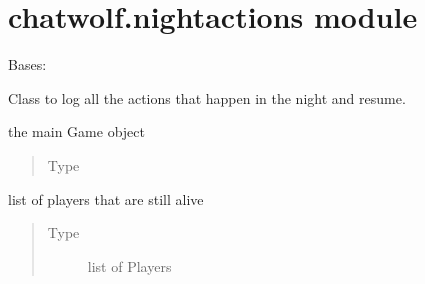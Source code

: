 \documentclass[letterpaper,10pt,english]{sphinxmanual}
\begin{document}
\section{chatwolf.nightactions module}
\label{\detokenize{chatwolf:module-chatwolf.nightactions}}\label{\detokenize{chatwolf:chatwolf-nightactions-module}}

\begin{fulllineitems}
\label{\detokenize{chatwolf:chatwolf.nightactions.Nightactions}}
Bases: 

Class to log all the actions that happen in the night and resume.

\begin{fulllineitems}
\label{\detokenize{chatwolf:chatwolf.nightactions.Nightactions.game}}
the main Game object
\begin{quote}\begin{description}
\item[{Type}] \leavevmode
{\hyperref[\detokenize{chatwolf:chatwolf.game.Game}]{}}

\end{description}\end{quote}

\end{fulllineitems}


\begin{fulllineitems}
\label{\detokenize{chatwolf:chatwolf.nightactions.Nightactions.alive}}
list of players that are still alive
\begin{quote}\begin{description}
\item[{Type}] \leavevmode
list of Players


\end{description}
\end{quote}
\end{fulllineitems}
\end{fulllineitems}
\end{document}
